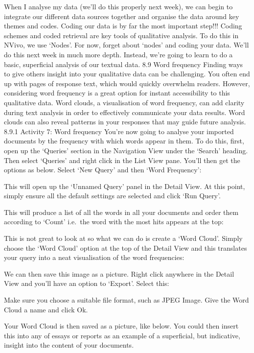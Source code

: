 \documentclass[
]{book}
\begin{document}
When I analyse my data (we'll do this properly next week), we can begin to integrate our different data sources together and organise the data around key themes and codes. Coding our data is by far the most important step!!! Coding schemes and coded retrieval are key tools of qualitative analysis. To do this in NVivo, we use `Nodes'.
For now, forget about `nodes' and coding your data. We'll do this next week in much more depth. Instead, we're going to learn to do a basic, superficial analysis of our textual data.
8.9 Word frequency
Finding ways to give others insight into your qualitative data can be challenging. You often end up with pages of response text, which would quickly overwhelm readers. However, considering word frequency is a great option for instant accessibility to this qualitative data.
Word clouds, a visualisation of word frequency, can add clarity during text analysis in order to effectively communicate your data results. Word clouds can also reveal patterns in your responses that may guide future analysis.
8.9.1 Activity 7: Word frequency
You're now going to analyse your imported documents by the frequency with which words appear in them. To do this, first, open up the `Queries' section in the Navigation View under the `Search' heading. Then select `Queries' and right click in the List View pane. You'll then get the options as below. Select `New Query' and then `Word Frequency':

This will open up the `Unnamed Query' panel in the Detail View. At this point, simply ensure all the default settings are selected and click `Run Query'.

This will produce a list of all the words in all your documents and order them according to `Count' i.e.~the word with the most hits appears at the top:

This is not great to look at so what we can do is create a `Word Cloud'. Simply choose the `Word Cloud' option at the top of the Detail View and this translates your query into a neat visualisation of the word frequencies:

We can then save this image as a picture. Right click anywhere in the Detail View and you'll have an option to `Export'. Select this:

Make sure you choose a suitable file format, such as JPEG Image. Give the Word Cloud a name and click Ok.

Your Word Cloud is then saved as a picture, like below. You could then insert this into any of essays or reports as an example of a superficial, but indicative, insight into the content of your documents.
\end{document}
